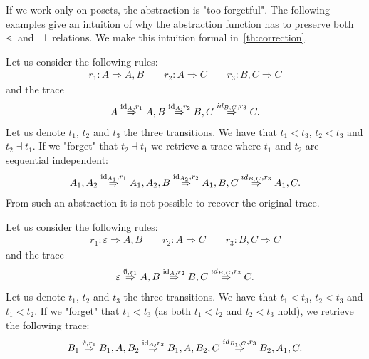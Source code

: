 If we work only on posets, the abstraction is "too forgetful".
The following examples give an intuition of why the abstraction function has to preserve both $\lessdot$ and $\dashv$ relations. We make this intuition formal in~\autoref{th:correction}.

\begin{example}
  Let us consider the following rules:
  \begin{align*}
    r_1:A \Rightarrow A, B\qquad r_2:A \Rightarrow C \qquad r_3: B,C \Rightarrow C
  \end{align*}
  and the trace
  \begin{align*}
    A \overset{\text{id}_A,r_1}{\Rightarrow} A, B \overset{\text{id}_A,r_2}{\Rightarrow} B,C \overset{id_{B,C},r_3}{\Rightarrow}C.
  \end{align*}
  Let us denote $t_1$, $t_2$ and $t_3$ the three transitions. We have that $t_1<t_3$, $t_2<t_3$ and $t_2\dashv t_1$. If we "forget" that $t_2\dashv t_1$ we retrieve a trace where $t_1$ and $t_2$ are sequential independent:
  \begin{align*}
    A_1,A_2 \overset{\text{id}_{A_1},r_1}{\Rightarrow} A_1,A_2,B \overset{\text{id}_{A_2},r_2}{\Rightarrow} A_1,B,C \overset{id_{B,C},r_3}{\Rightarrow} A_1,C.
  \end{align*}
  From such an abstraction it is not possible to recover the original trace.
\end{example}

\begin{example}
  Let us consider the following rules:
  \begin{align*}
    r_1:\varepsilon \Rightarrow A, B\qquad r_2:A \Rightarrow C \qquad r_3: B,C \Rightarrow C
  \end{align*}
  and the trace
  \begin{align*}
    \varepsilon \overset{\emptyset,r_1}{\Rightarrow} A, B \overset{\text{id}_A,r_2}{\Rightarrow} B,C \overset{id_{B,C},r_3}{\Rightarrow}C.
  \end{align*}
  Let us denote $t_1$, $t_2$ and $t_3$ the three transitions. We have that $t_1<t_3$, $t_2<t_3$ and $t_1< t_2$. If we "forget" that $t_1< t_3$ (as both $t_1<t_2$ and $t_2<t_3$ hold), we retrieve the following trace:
  \begin{align*}
    B_1 \overset{\emptyset,r_1}{\Rightarrow} B_1,A,B_2 \overset{\text{id}_{A},r_2}{\Rightarrow} B_1,A,B_2,C \overset{id_{B_1,C},r_3}{\Rightarrow} B_2,A_1,C.
  \end{align*}
\end{example}

